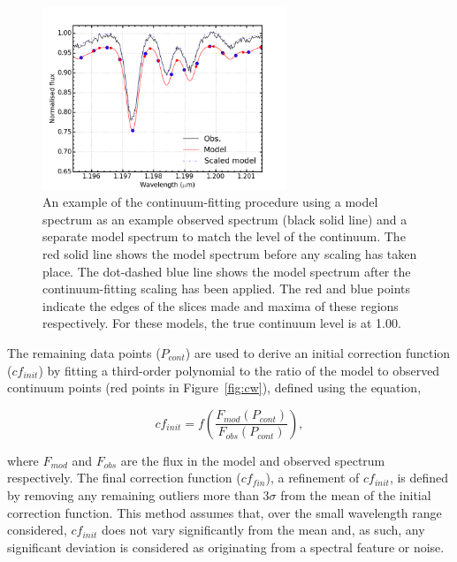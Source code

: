 \begin{figure}
 \centering
\includegraphics[width=0.65\textwidth]{JAnal/cftaction}
\caption[An example of the continuum-fitting procedure on individual diagnostic lines]{
An example of the continuum-fitting procedure using a model spectrum as an example observed spectrum (black solid line) and a separate model spectrum to match the level of the continuum.
The red solid line shows the model spectrum before any scaling has taken place.
The dot-dashed blue line shows the model spectrum after the continuum-fitting scaling has been applied.
The red and blue points indicate the edges of the slices made and maxima of these regions respectively.
For these models, the true continuum level is at 1.00.\label{fig:cftaction}
         }
\end{figure}

The remaining data points ($P_{cont}$) are used to derive an initial correction function
($cf_{init}$) by fitting a third-order polynomial to the ratio of the model to observed continuum points (red points in Figure~\ref{fig:cw}), defined using the equation,

\begin{equation}
    cf_{init} = f\left(\frac{F_{mod}(P_{cont})}{F_{obs}(P_{cont})}\right),
    \label{eq:cf_init}
\end{equation}

where $F_{mod}$ and $F_{obs}$ are the flux in the model and observed spectrum respectively.
The final correction function ($cf_{fin}$), a refinement of $cf_{init}$,
is defined by removing any remaining outliers more than 3$\sigma$ from the mean of the initial correction function.
This method assumes that, over the small wavelength range considered,
$cf_{init}$ does not vary significantly from the mean and, as such, any significant deviation is considered as originating from a spectral feature or noise.

